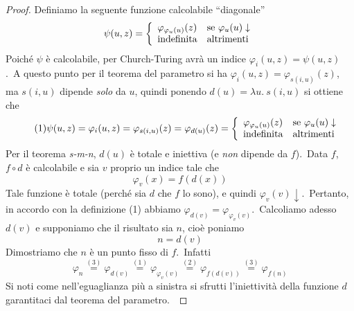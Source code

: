 \begin{proof}
    Definiamo la seguente funzione calcolabile ``diagonale''
    \[\psi(u,z) = \left\{\begin{array}{l l}
            \varphi_{\varphi_u(u)}(z) & \mathrm{se}\ \varphi_u(u) \downarrow \\
            \mathrm{indefinita}       & \mathrm{altrimenti}                  \\
        \end{array}\right.\]
    Poiché $\psi$ è calcolabile, per Church-Turing avrà un indice $\varphi_i(u,z) = \psi(u,z)$.\
    A questo punto per il teorema del parametro si ha $\varphi_i(u,z) = \varphi_{s(i,u)}(z)$, ma $s(i,u)$ dipende \textit{solo} da $u$, quindi ponendo $d(u) = \lambda u.\ s(i,u)$ si ottiene che
    \begin{equation}
        \tag{1}
        \psi(u,z) = \varphi_i(u,z) = \varphi_{s(i,u)}(z) = \varphi_{d(u)}(z) = \left\{\begin{array}{l l}
            \varphi_{\varphi_u(u)}(z) & \mathrm{se}\ \varphi_u(u) \downarrow \\
            \mathrm{indefinita}       & \mathrm{altrimenti}                  \\
        \end{array}\right.\
    \end{equation}
    Per il teorema \textit{s-m-n}, $d(u)$ è totale e iniettiva (e \textit{non} dipende da $f$).\
    Data $f$, $f \circ d$ è calcolabile e sia $v$ proprio un indice tale che
    \begin{equation}
        \tag{2}
        \varphi_v(x) = f(d(x))
    \end{equation}
    Tale funzione è totale (perché sia $d$ che $f$ lo sono), e quindi $\varphi_v(v)\downarrow$.\
    Pertanto, in accordo con la definizione (1) abbiamo $\varphi_{d(v)} = \varphi_{\varphi_v(v)}$.\
    Calcoliamo adesso $d(v)$ e supponiamo che il risultato sia $n$, cioè poniamo
    \begin{equation}
        \tag{3}
        n = d(v)
    \end{equation}
    Dimostriamo che $n$ è un punto fisso di $f$.\
    Infatti
    \[\varphi_n \stackrel{(3)}{=} \varphi_{d(v)} \stackrel{(1)}{=} \varphi_{\varphi_v(v)} \stackrel{(2)}{=} \varphi_{f(d(v))} \stackrel{(3)}{=} \varphi_{f(n)}\]
    Si noti come nell'eguaglianza più a sinistra si sfrutti l'iniettività della funzione $d$ garantitaci dal teorema del parametro.\

\end{proof}

